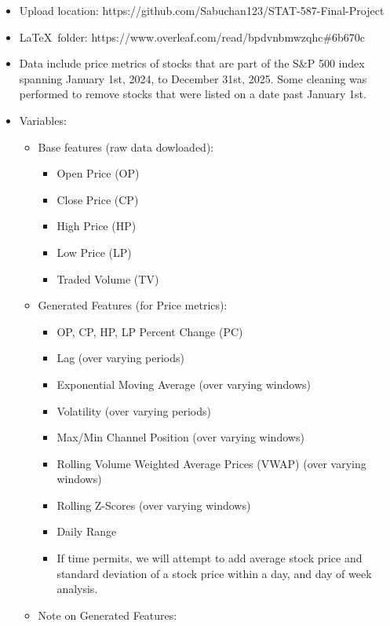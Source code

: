 \documentclass[11pt]{article}
\begin{document}
\begin{itemize}
    \item Upload location: https://github.com/Sabuchan123/STAT-587-Final-Project
    
    \item \LaTeX \ folder: https://www.overleaf.com/read/bpdvnbmwzqhc\#6b670c

    \item Data include price metrics of stocks that are part of the S\&P 500 index spanning January 1st, 2024, to December 31st, 2025. Some cleaning was performed to remove stocks that were listed on a date past January 1st.
    \item Variables: \begin{itemize}
        \item Base features (raw data dowloaded): 
        \begin{itemize}
            \item Open Price (OP)
            \item Close Price (CP)
            \item High Price (HP)
            \item Low Price (LP)
            \item Traded Volume (TV)
        \end{itemize}
        \item Generated Features (for Price metrics): 
        \begin{itemize}
            \item OP, CP, HP, LP Percent Change (PC)
            \item Lag (over varying periods)
            \item Exponential Moving Average (over varying windows)
            \item Volatility (over varying periods)
            \item Max/Min Channel Position (over varying windows)
            \item Rolling Volume Weighted Average Prices (VWAP) (over varying windows)
            \item Rolling Z-Scores (over varying windows)
            \item Daily Range
            \item If time permits, we will attempt to add average stock price and standard deviation of a stock price within a day, and day of week analysis. 
        \end{itemize}
        \item Note on Generated Features:

\end{itemize}
\end{itemize}
\end{document}
